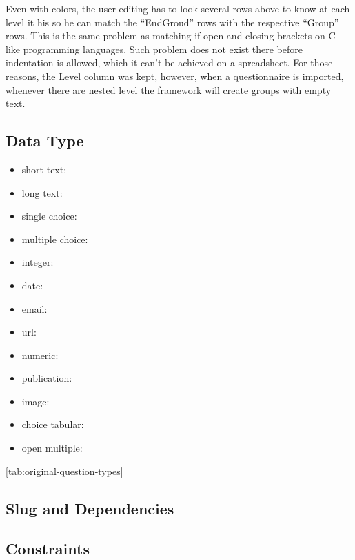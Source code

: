 Even with colors, the user editing has to look several rows above to know at each level it his so he can match the ``EndGroud'' rows with the respective ``Group'' rows.
This is the same problem as matching if open and closing brackets on C-like programming languages.
Such problem does not exist there before indentation is allowed, which it can't be achieved on a spreadsheet.
For those reasons, the Level column was kept, however, when a questionnaire is imported, whenever there are nested level the framework will create groups with empty text.

\subsection*{Data Type}

\begin{itemize}
    \item short text:
    \item long text:
    \item single choice:
    \item multiple choice:
    \item integer:
    \item date:
    \item email:
    \item url:
    \item numeric:
    \item publication:
    \item image:
    \item choice tabular:
    \item open multiple:
\end{itemize}

\ref{tab:original-question-types}

\subsection*{Slug and Dependencies}

\subsection*{Constraints}
